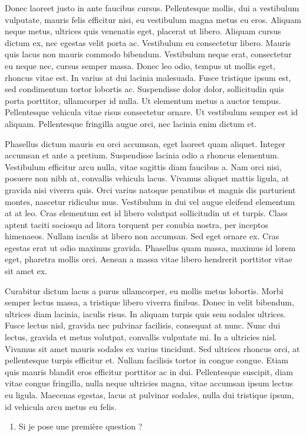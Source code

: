 \documentclass[10pt,fleqn]{article} %
\begin{document}
\begin{remark}
Donec laoreet justo in ante faucibus cursus. Pellentesque mollis, dui a vestibulum vulputate, mauris felis efficitur nisi, eu vestibulum magna metus eu eros. Aliquam neque metus, ultrices quis venenatis eget, placerat ut libero. Aliquam cursus dictum ex, nec egestas velit porta ac. Vestibulum eu consectetur libero. Mauris quis lacus non mauris commodo bibendum. Vestibulum neque erat, consectetur eu neque nec, cursus semper massa. Donec leo odio, tempus ut mollis eget, rhoncus vitae est. In varius at dui lacinia malesuada. Fusce tristique ipsum est, sed condimentum tortor lobortis ac. Suspendisse dolor dolor, sollicitudin quis porta porttitor, ullamcorper id nulla. Ut elementum metus a auctor tempus. Pellentesque vehicula vitae risus consectetur ornare. Ut vestibulum semper est id aliquam. Pellentesque fringilla augue orci, nec lacinia enim dictum et.
\end{remark}

\begin{obj}
Phasellus dictum mauris eu orci accumsan, eget laoreet quam aliquet. Integer accumsan et ante a pretium. Suspendisse lacinia odio a rhoncus elementum. Vestibulum efficitur arcu nulla, vitae sagittis diam faucibus a. Nam orci nisi, posuere non nibh at, convallis vehicula lacus. Vivamus aliquet mattis ligula, at gravida nisi viverra quis. Orci varius natoque penatibus et magnis dis parturient montes, nascetur ridiculus mus. Vestibulum in dui vel augue eleifend elementum at at leo. Cras elementum est id libero volutpat sollicitudin ut et turpis. Class aptent taciti sociosqu ad litora torquent per conubia nostra, per inceptos himenaeos. Nullam iaculis at libero non accumsan. Sed eget ornare ex. Cras egestas erat ut odio maximus gravida. Phasellus quam massa, maximus id lorem eget, pharetra mollis orci. Aenean a massa vitae libero hendrerit porttitor vitae sit amet ex.
\end{obj}

\begin{exercise}
Curabitur dictum lacus a purus ullamcorper, eu mollis metus lobortis. Morbi semper lectus massa, a tristique libero viverra finibus. Donec in velit bibendum, ultrices diam lacinia, iaculis risus. In aliquam turpis quis sem sodales ultrices. Fusce lectus nisl, gravida nec pulvinar facilisis, consequat at nunc. Nunc dui lectus, gravida et metus volutpat, convallis vulputate mi. In a ultricies nisl. Vivamus sit amet mauris sodales ex varius tincidunt. Sed ultrices rhoncus orci, at pellentesque turpis efficitur et. Nullam facilisis tortor in congue congue. Etiam quis mauris blandit eros efficitur porttitor ac in dui. Pellentesque suscipit, diam vitae congue fringilla, nulla neque ultricies magna, vitae accumsan ipsum lectus eu ligula. Maecenas egestas, lacus at pulvinar sodales, nulla dui tristique ipsum, id vehicula arcu metus eu felis.

\begin{enumerate}
    \item Si je pose une première question ? 
\end{enumerate}
\end{exercise}
\end{document}
